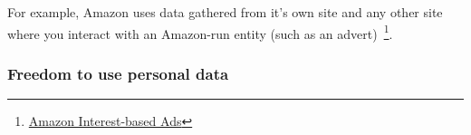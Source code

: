 For example, Amazon uses data gathered from it's own site and any other site where you interact with an Amazon-run entity (such as an advert)~\footnote{\href{https://www.amazon.com/b?node=5160028011}{Amazon Interest-based Ads}}. 

\subsubsection{Freedom to use personal data}

